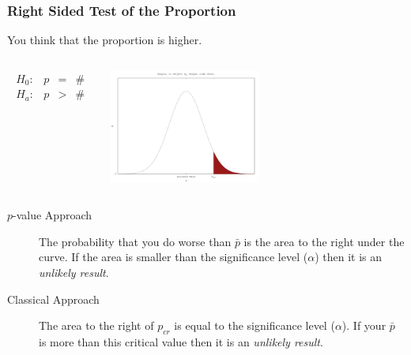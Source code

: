 \begin{frame}
  \frametitle{Right Sided Test of the Proportion}

  You think that the proportion is higher.

  \begin{columns}
    \begin{eqnarray*}
      \begin{array}{lrcl}
        H_0: & p & = & \# \\
        H_a: & p & > & \#
      \end{array}
    \end{eqnarray*}


    \includegraphics[width=5cm]{img/rightSideHypothesisTest}

  \end{columns}

  \begin{description}
  \item[$p$-value Approach] The probability that you do worse than
    $\bar{p}$ is the area to the right under the curve. If the area is
    smaller than the significance level ($\alpha$) then it is an
    \textit{unlikely result}.
  \item[Classical Approach] The area to the right of $p_{cr}$ is
    equal to the significance level ($\alpha$). If your $\bar{p}$ is
    more than this critical value then it is an \textit{unlikely
      result}.
  \end{description}


\end{frame}


